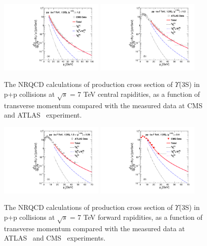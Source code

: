 \documentclass[twocolumn,amsmath,amssymb]{snp}
\begin{document}
\begin{figure}
  \includegraphics[width=0.45\textwidth]{Y3S_CMS.pdf}
  \includegraphics[width=0.45\textwidth]{Y3S_ATLAS.pdf} 
 \caption{The NRQCD calculations of production cross section of $\Upsilon$(3S) in p+p collisions at 
   $\sqrt{s}$ = 7 TeV central rapidities, as a function of transverse momentum compared with the measured data 
   at CMS~\cite{Khachatryan:2015qpa} and ATLAS~\cite{Aad:2012dlq} experiment. }
  \label{Fig:SigmaY3SCMS}
\end{figure}

\begin{figure}
  \includegraphics[width=0.45\textwidth]{Y3S_ATLAS_Rap12225.pdf}
  \includegraphics[width=0.45\textwidth]{Y3S_CMS_Rapl24.pdf} 
 \caption{The NRQCD calculations of production cross section of $\Upsilon$(3S) in p+p collisions at 
   $\sqrt{s}$ = 7 TeV forward rapidities, as a function of transverse momentum compared with the measured data 
   at ATLAS~\cite{Aad:2012dlq} and CMS~\cite{CMS_Rapl24} experiments. }
  \label{Fig:SigmaY3SCMS_forwardRap}
\end{figure}
\end{document}
